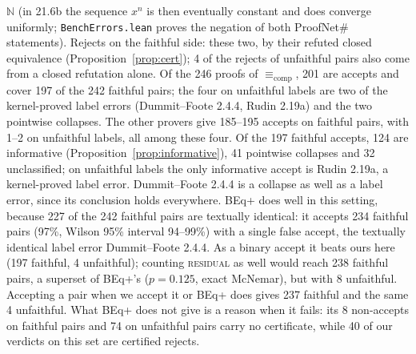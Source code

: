 \documentclass[10pt]{article}
\theoremstyle{definition}
\newcommand{\Ecomp}{\mathrel{\equiv_{\mathrm{comp}}}}
\newcommand{\V}[1]{\textsc{#1}}
\begin{document}
$\mathbb N$ (in 21.6b the sequence $x^n$ is then eventually constant and does converge uniformly;
\texttt{BenchErrors.lean} proves the negation of both ProofNet\# statements). Rejects on
the faithful side: these two, by their refuted closed equivalence (Proposition~\ref{prop:cert});
4 of the rejects of unfaithful pairs also come from a closed refutation alone. Of the 246 proofs of $\Ecomp$, 201 are accepts and cover 197 of the
242 faithful pairs; the four on unfaithful labels are two of the kernel-proved label errors
(Dummit--Foote 2.4.4, Rudin 2.19a) and the two pointwise collapses. The other provers give
185--195 accepts on faithful pairs, with 1--2 on unfaithful labels, all among these four.
Of the 197 faithful accepts, 124 are informative (Proposition~\ref{prop:informative}),
41 pointwise collapses and 32 unclassified; on unfaithful labels the only informative
accept is Rudin 2.19a, a kernel-proved label error. Dummit--Foote 2.4.4 is a collapse as well
as a label error, since its conclusion holds everywhere.
BEq+ does well in this setting, because 227 of the 242 faithful pairs are textually identical:
it accepts 234 faithful pairs (97\%, Wilson 95\% interval 94--99\%) with a single false accept,
the textually identical label error Dummit--Foote 2.4.4. As a binary accept it beats ours here
(197 faithful, 4 unfaithful); counting \V{residual} as well would reach 238 faithful pairs, a
superset of BEq+'s ($p=0.125$, exact McNemar), but with 8 unfaithful. Accepting a pair when we
accept it or BEq+ does gives 237 faithful and the same 4 unfaithful. What BEq+ does not give is a
reason when it fails: its 8 non-accepts on faithful pairs and 74 on unfaithful pairs carry no
certificate, while 40 of our verdicts on this set are certified rejects.
\end{document}
